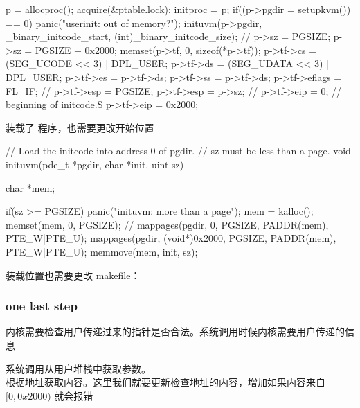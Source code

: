 \begin{ccode}
    p = allocproc();
    acquire(&ptable.lock);
    initproc = p;
    if((p->pgdir = setupkvm()) == 0)
    panic("userinit: out of memory?");
    inituvm(p->pgdir, _binary_initcode_start, (int)_binary_initcode_size);
    // p->sz = PGSIZE;
    p->sz = PGSIZE + 0x2000;
    memset(p->tf, 0, sizeof(*p->tf));
    p->tf->cs = (SEG_UCODE << 3) | DPL_USER;
    p->tf->ds = (SEG_UDATA << 3) | DPL_USER;
    p->tf->es = p->tf->ds;
    p->tf->ss = p->tf->ds;
    p->tf->eflags = FL_IF;
    // p->tf->esp = PGSIZE;
    p->tf->esp = p->sz;
    // p->tf->eip = 0;  // beginning of initcode.S
    p->tf->eip = 0x2000;
\end{ccode}

 装载了  程序，也需要更改开始位置

\begin{ccode}
    // Load the initcode into address 0 of pgdir.
    // sz must be less than a page.
    void
    inituvm(pde_t *pgdir, char *init, uint sz)
    {
        char *mem;
        
        if(sz >= PGSIZE)
            panic("inituvm: more than a page");
        mem = kalloc();
        memset(mem, 0, PGSIZE);
        // mappages(pgdir, 0, PGSIZE, PADDR(mem), PTE_W|PTE_U);
        mappages(pgdir, (void*)0x2000, PGSIZE, PADDR(mem), PTE_W|PTE_U);
        memmove(mem, init, sz);
    }
\end{ccode}

 装载位置也需要更改 makefile：


\subsubsection{one last step}

内核需要检查用户传递过来的指针是否合法。系统调用时候内核需要用户传递的信息

系统调用从用户堆栈中获取参数。 \\
 根据地址获取内容。这里我们就要更新检查地址的内容，增加如果内容来自 $[0,0x2000)$ 就会报错

